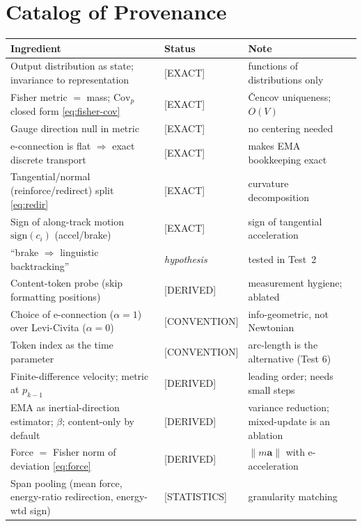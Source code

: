\documentclass[11pt]{article}
\newcommand{\Cov}{\mathrm{Cov}}
\begin{document}
\section{Catalog of Provenance}
\label{sec:catalog}

\begin{center}
\begin{tabular}{@{}p{} l p{}@{}}
\toprule
\textbf{Ingredient} & \textbf{Status} & \textbf{Note} \\
\midrule
Output distribution as state; invariance to representation & \textsf{[EXACT]} & functions of distributions only \\
Fisher metric $=$ mass; $\Cov_p$ closed form \eqref{eq:fisher-cov} & \textsf{[EXACT]} & \v{C}encov uniqueness; $O(V)$ \\
Gauge direction null in metric & \textsf{[EXACT]} & no centering needed \\
e-connection is flat $\Rightarrow$ exact discrete transport & \textsf{[EXACT]} & makes EMA bookkeeping exact \\
Tangential/normal (reinforce/redirect) split \eqref{eq:redir} & \textsf{[EXACT]} & curvature decomposition \\
Sign of along-track motion $\mathrm{sign}(c_i)$ (accel/brake) & \textsf{[EXACT]} & sign of tangential acceleration \\
``brake $\Rightarrow$ linguistic backtracking'' & \emph{hypothesis} & tested in Test~2 \\
Content-token probe (skip formatting positions) & \textsf{[DERIVED]} & measurement hygiene; ablated \\
Choice of e-connection ($\alpha{=}1$) over Levi-Civita ($\alpha{=}0$) & \textsf{[CONVENTION]} & info-geometric, not Newtonian \\
Token index as the time parameter & \textsf{[CONVENTION]} & arc-length is the alternative (Test 6) \\
Finite-difference velocity; metric at $p_{k-1}$ & \textsf{[DERIVED]} & leading order; needs small steps \\
EMA as inertial-direction estimator; $\beta$; content-only by default & \textsf{[DERIVED]} & variance reduction; mixed-update is an ablation \\
Force $=$ Fisher norm of deviation \eqref{eq:force} & \textsf{[DERIVED]} & $\lVert m\bm a\rVert$ with e-acceleration \\
Span pooling (mean force, energy-ratio redirection, energy-wtd sign) & \textsf{[STATISTICS]} & granularity matching \\

\end{tabular}
\end{center}
\end{document}
